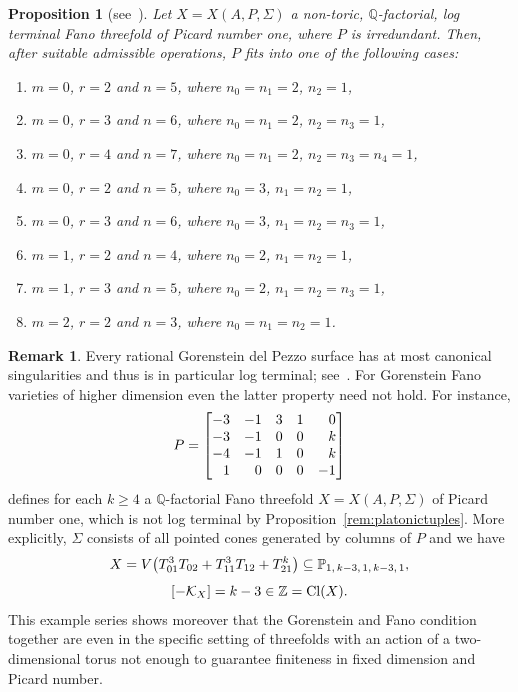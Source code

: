 \documentclass[10pt,a4paper]{amsart}
\newtheorem{prop}[thm]{Proposition}
\theoremstyle{definition}
\newtheorem{rema}[thm]{Remark}
\def\Cl{{\rm Cl}}
\def\ZZ{{\mathbb Z}}
\def\QQ{{\mathbb Q}}
\def\PP{{\mathbb P}}
\numberwithin{equation}{section}
\begin{document}
\begin{prop}[{see~\cite[Lemma~5.2]{BeHaHuNi}}]
\label{rem:piconeconfigs}
Let $X = X(A,P,\Sigma)$ a non-toric,
$\QQ$-factorial, log terminal Fano threefold
of Picard number one, where $P$ is irredundant.
Then, after suitable admissible operations,
$P$ fits into one of the following cases:
\begin{enumerate}\itemsep=0pt
\item[$(i)$]
 $m=0$, $r=2$ and $n=5$, where $n_0 = n_1 = 2$, $n_2 = 1$,
\item[$(ii)$]
 $m=0$, $r=3$ and $n=6$, where $n_0 = n_1 = 2$, $n_2 = n_3 = 1$,
\item[$(iii)$]
 $m=0$, $r=4$ and $n=7$, where $n_0 = n_1 = 2$, $n_2 = n_3 = n_4 = 1$,
\item[$(iv)$]
 $m=0$, $r=2$ and $n=5$, where $n_0 = 3$, $n_1 = n_2 = 1$,
\item[$(v)$]
 $m=0$, $r=3$ and $n=6$, where $n_0 = 3$, $n_1 = n_2 = n_3 = 1$,
\item[$(vi)$]
$m=1$, $r=2$ and $n=4$, where $n_0 = 2$, $n_1 = n_2 = 1$,
\item[$(vii)$]
$m=1$, $r=3$ and $n=5$, where $n_0 = 2$, $n_1 = n_2 = n_3 = 1$,
\item[$(viii)$]
$m=2$, $r=2$ and $n=3$, where $n_0 = n_1 = n_2 = 1$.
\end{enumerate}
\end{prop}




\begin{rema}
Every rational Gorenstein del Pezzo surface has
at most canonical singularities and thus is in
particular log terminal; see~\cite{HiWa}.
For Gorenstein Fano varieties of higher dimension
even the latter property need not hold. For instance,
\[
P =\begin{bmatrix}
-3 & -1 & 3 & 1 & $\phantom{$-$}$0
\\
-3 & -1 & 0 & 0 & $\phantom{$-$}$k
\\
-4 & -1 & 1 & 0 & $\phantom{$-$}$k
\\
 $\phantom{$-$}$1 & $\phantom{$-$}$0 & 0 & 0 & -1
\end{bmatrix}
\]
defines for each $k \ge 4$ a $\QQ$-factorial
Fano threefold $X = X(A,P,\Sigma)$ of Picard number
one, which is not log terminal by
Proposition~\ref{rem:platonictuples}.
More explicitly, $\Sigma$ consists of all
pointed cones generated by columns of $P$
and we have
\begin{gather*}
X =
V\big(T_{01}^3T_{02} + T_{11}^3T_{12} + T_{21}^k\big)
 \subseteq\PP_{1,\, k-3, \, 1, \, k-3, \, 1},
\\[1ex]
[ - \mathcal{K}_X ] =k - 3 \in\ZZ =\Cl(X).
\end{gather*}
This example series shows moreover that the
Gorenstein and Fano condition together are
even in the specific setting of threefolds
with an action of a two-dimensional torus
not enough to guarantee finiteness in fixed
dimension and Picard number.
\end{rema}
\end{document}
